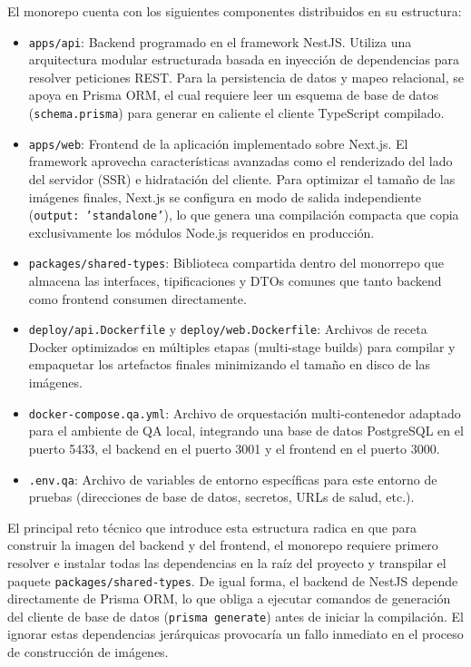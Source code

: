 \documentclass{article}
\begin{document}
El monorepo cuenta con los siguientes componentes distribuidos en su estructura:
\begin{itemize}[leftmargin=*]
    \item \texttt{apps/api}: Backend programado en el framework NestJS. Utiliza una arquitectura modular estructurada basada en inyección de dependencias para resolver peticiones REST. Para la persistencia de datos y mapeo relacional, se apoya en Prisma ORM, el cual requiere leer un esquema de base de datos (\texttt{schema.prisma}) para generar en caliente el cliente TypeScript compilado.
    \item \texttt{apps/web}: Frontend de la aplicación implementado sobre Next.js. El framework aprovecha características avanzadas como el renderizado del lado del servidor (SSR) e hidratación del cliente. Para optimizar el tamaño de las imágenes finales, Next.js se configura en modo de salida independiente (\texttt{output: 'standalone'}), lo que genera una compilación compacta que copia exclusivamente los módulos Node.js requeridos en producción.
    \item \texttt{packages/shared-types}: Biblioteca compartida dentro del monorrepo que almacena las interfaces, tipificaciones y DTOs comunes que tanto backend como frontend consumen directamente.
    \item \texttt{deploy/api.Dockerfile} y \texttt{deploy/web.Dockerfile}: Archivos de receta Docker optimizados en múltiples etapas (multi-stage builds) para compilar y empaquetar los artefactos finales minimizando el tamaño en disco de las imágenes.
    \item \texttt{docker-compose.qa.yml}: Archivo de orquestación multi-contenedor adaptado para el ambiente de QA local, integrando una base de datos PostgreSQL en el puerto 5433, el backend en el puerto 3001 y el frontend en el puerto 3000.
    \item \texttt{.env.qa}: Archivo de variables de entorno específicas para este entorno de pruebas (direcciones de base de datos, secretos, URLs de salud, etc.).
\end{itemize}

El principal reto técnico que introduce esta estructura radica en que para construir la imagen del backend y del frontend, el monorepo requiere primero resolver e instalar todas las dependencias en la raíz del proyecto y transpilar el paquete \texttt{packages/shared-types}. De igual forma, el backend de NestJS depende directamente de Prisma ORM, lo que obliga a ejecutar comandos de generación del cliente de base de datos (\texttt{prisma generate}) antes de iniciar la compilación. El ignorar estas dependencias jerárquicas provocaría un fallo inmediato en el proceso de construcción de imágenes.
\end{document}
